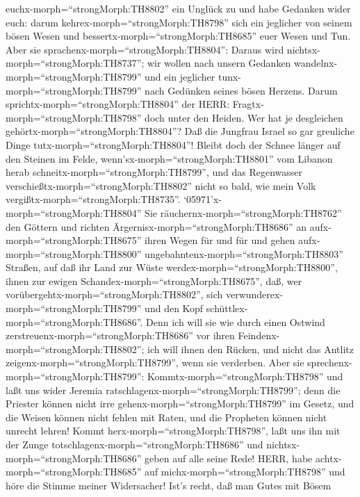 euchx-morph=``strongMorph:TH8802'' ein Unglück zu und habe Gedanken
wider euch: darum kehrex-morph=``strongMorph:TH8798'' sich ein jeglicher
von seinem bösen Wesen und bessertx-morph=``strongMorph:TH8685'' euer
Wesen und Tun.  Aber sie
sprachenx-morph=``strongMorph:TH8804'': Daraus wird
nichtsx-morph=``strongMorph:TH8737''; wir wollen nach unsern Gedanken
wandelnx-morph=``strongMorph:TH8799'' und ein jeglicher
tunx-morph=``strongMorph:TH8799'' nach Gedünken seines bösen Herzens.
 Darum sprichtx-morph=``strongMorph:TH8804'' der HERR:
Fragtx-morph=``strongMorph:TH8798'' doch unter den Heiden. Wer hat je
desgleichen gehörtx-morph=``strongMorph:TH8804''? Daß die Jungfrau
Israel so gar greuliche Dinge tutx-morph=``strongMorph:TH8804''!
 Bleibt doch der Schnee länger auf den Steinen im Felde,
wenn'sx-morph=``strongMorph:TH8801'' vom Libanon herab
schneitx-morph=``strongMorph:TH8799'', und das Regenwasser
verschießtx-morph=``strongMorph:TH8802'' nicht so bald, wie mein Volk
vergißtx-morph=``strongMorph:TH8735''. 
`05971'x-morph=``strongMorph:TH8804'' Sie
räuchernx-morph=``strongMorph:TH8762'' den Göttern und richten
Ärgernisx-morph=``strongMorph:TH8686'' an
aufx-morph=``strongMorph:TH8675'' ihren Wegen für und für und gehen
aufx-morph=``strongMorph:TH8800''
ungebahntenx-morph=``strongMorph:TH8803'' Straßen,  auf daß
ihr Land zur Wüste werdex-morph=``strongMorph:TH8800'', ihnen zur ewigen
Schandex-morph=``strongMorph:TH8675'', daß, wer
vorübergehtx-morph=``strongMorph:TH8802'', sich
verwunderex-morph=``strongMorph:TH8799'' und den Kopf
schüttlex-morph=``strongMorph:TH8686''.  Denn ich will sie
wie durch einen Ostwind zerstreuenx-morph=``strongMorph:TH8686'' vor
ihren Feindenx-morph=``strongMorph:TH8802''; ich will ihnen den Rücken,
und nicht das Antlitz zeigenx-morph=``strongMorph:TH8799'', wenn sie
verderben.  Aber sie
sprechenx-morph=``strongMorph:TH8799'':
Kommtx-morph=``strongMorph:TH8798'' und laßt uns wider Jeremia
ratschlagenx-morph=``strongMorph:TH8799''; denn die Priester können
nicht irre gehenx-morph=``strongMorph:TH8799'' im Gesetz, und die Weisen
können nicht fehlen mit Raten, und die Propheten können nicht unrecht
lehren! Kommt herx-morph=``strongMorph:TH8798'', laßt uns ihn mit der
Zunge totschlagenx-morph=``strongMorph:TH8686'' und
nichtsx-morph=``strongMorph:TH8686'' geben auf alle seine Rede!
 HERR, habe achtx-morph=``strongMorph:TH8685'' auf
michx-morph=``strongMorph:TH8798'' und höre die Stimme meiner
Widersacher!  Ist's recht, daß man Gutes mit Bösem
